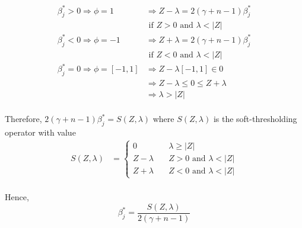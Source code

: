 \documentclass[12pt, reqno]{amsart}
\theoremstyle{definition}
\theoremstyle{remark}
\begin{document}
\begin{equation*}
\begin{split}
\beta_j^* > 0 \Rightarrow \phi = 1 &\Rightarrow Z  - \lambda = 2 (\gamma + n-1) \beta_j^*\\
& \text{ if $Z > 0$ and $\lambda < |Z|$} \\
\beta_j^* < 0 \Rightarrow \phi = -1 &\Rightarrow Z  + \lambda = 2 (\gamma + n-1) \beta_j^*\\
& \text{ if $Z < 0$ and $\lambda < |Z|$} \\
\beta_j^* = 0 \Rightarrow \phi = [-1,1] &\Rightarrow Z  - \lambda[-1,1] \in 0\\
&\Rightarrow Z - \lambda \leq 0 \leq Z + \lambda\\
& \Rightarrow \lambda > |Z| \\
\end{split}
\end{equation*}

Therefore, $2(\gamma + n - 1)\beta_j^* = S(Z, \lambda)$ where $S(Z, \lambda)$ is the soft-thresholding operator with value\\

\begin{equation*}
\begin{split}
S(Z, \lambda)
		&= \left\{
		\begin{array}{ll}
				0  & \quad \lambda \geq |Z|\\
				Z - \lambda & \quad Z > 0 \text{ and } \lambda < |Z|\\
				Z + \lambda & \quad Z < 0 \text{ and } \lambda < |Z|
			\end{array}
			\right. \\				
\end{split}
\end{equation*}

Hence, 
\begin{equation*}
\beta_j^* = \frac{S(Z, \lambda)}{2(\gamma + n - 1)}
\end{equation*}
\end{document}
